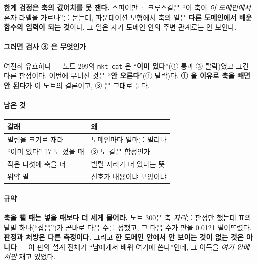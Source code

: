 \documentclass[10pt]{article}
\begin{document}
\textbf{한계 검정은 축의 값어치를 못 잰다.} 스피어만 · 크루스칼은 ``이 축이
\emph{이 도메인에서} 혼자 라벨을 가르나''를 묻는데, 파운데이션 모형에서 축의
일은 \textbf{다른 도메인에서 배운 함수의 입력이 되는 것}이다. 그 일은 자기
도메인 안의 주변 관계로는 안 보인다.

\paragraph{그러면 검사 ③ 은 무엇인가} 여전히 유효하다 --- 노트 299의
\texttt{mkt\_cat} 은 ``\textbf{이미 있다}''(① 통과 ③ 탈락)였고 그건 다른
판정이다. 이번에 무너진 것은 ``\textbf{안 오른다}''(① 탈락)다.
\textbf{① 을 이유로 축을 빼면 안 된다}가 이 노트의 결론이고, ③ 은 그대로 둔다.

\paragraph{남은 것}
\begin{center}\small
\begin{tabular}{ll}
\hline
갈래 & 왜 \\
\hline
빌림을 크기로 재라 & 도메인마다 얼마를 빌리나 \\
``이미 있다'' 17 도 껐을 때 & ③ 도 같은 함정인가 \\
작은 다섯에 축을 더 & 빌릴 자리가 더 있다는 뜻 \\
위약 팔 & 신호가 내용이냐 모양이냐 \\
\hline
\end{tabular}
\end{center}

\paragraph{규약} \textbf{축을 뺄 때는 넣을 때보다 더 세게 물어라.} 노트 300은
축 \emph{자리}를 판정만 했는데 표의 낱말 하나(``잡음'')가 곧바로 다음 수를
정했고, 그 다음 수가 판을 0.0121 떨어뜨렸다. \textbf{판정과 처방은 다른
측정이다.} 그리고 \textbf{한 도메인 안에서 안 보이는 것이 없는 것은 아니다}
--- 이 판의 설계 전체가 ``남에게서 배워 여기에 쓴다''인데, 그 이득을
\emph{여기 안에서만} 재고 있었다.
\end{document}

